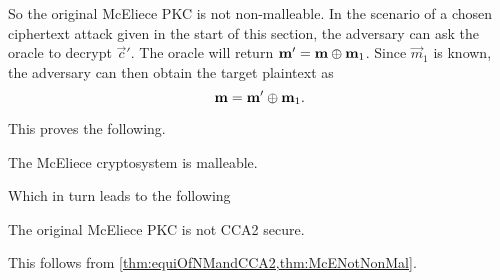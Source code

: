 So the original McEliece PKC is not non-malleable. In the scenario of a chosen ciphertext attack given in the start of this section, the adversary can ask the oracle to decrypt $\vec{c}'$. The oracle will return $\boldsymbol{\mathrm{m}}' = \boldsymbol{\mathrm{m}} \mathbin{\oplus} \boldsymbol{\mathrm{m}}_1$. Since $\vec{m}_1$ is known, the adversary can then obtain the target plaintext as
\[
	\boldsymbol{\mathrm{m}} = \boldsymbol{\mathrm{m}}' \mathbin{\oplus} \boldsymbol{\mathrm{m}}_1.
\]

This proves the following.
\begin{thm}
\label{thm:McENotNonMal}
	The McEliece cryptosystem is malleable.
\end{thm}

Which in turn leads to the following
\begin{cor}
\label{cor:McENotCCA2Sec}
	The original McEliece PKC is not CCA2 secure.
	\begin{Proof}
		This follows from \cref{thm:equiOfNMandCCA2,thm:McENotNonMal}.
	\end{Proof}
\end{cor}

